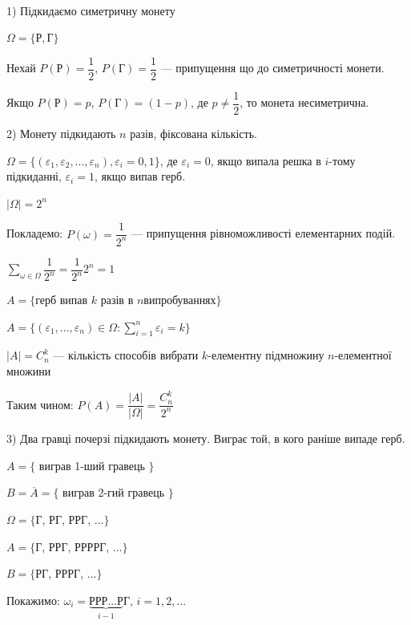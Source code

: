 \begin{example}~\par
    1) Підкидаємо симетричну монету

    $\Omega = \{\text{Р}, \text{Г}\}$

    Нехай $P(\text{Р}) = \dfrac{1}{2}$,
    $P(\text{Г}) = \dfrac{1}{2}$ --- припущення що до
    симетричності монети.

    Якщо $P(\text{Р}) = p$, $P(\text{Г}) = (1-p)$, де
    $p \neq \dfrac{1}{2}$, то монета несиметрична.

    2) Монету підкидають $n$ разів, фіксована кількість.

    $\Omega = \{(\varepsilon_1, \varepsilon_2, ..., \varepsilon_n), \varepsilon_i = 0,1\}$,
    де $\varepsilon_i = 0$, якщо випала решка в $i$-тому
    підкиданні, $\varepsilon_i = 1$, якщо випав герб.

    $|\Omega| = 2^n$

    Покладемо: $P(\omega) = \dfrac{1}{2^n}$ --- припущення
    рівноможливості елементарних подій.

    \begin{remark}
        $\sum\limits_{\omega \in \Omega} \dfrac{1}{2^n}
        = \dfrac{1}{2^n} 2^n = 1$

        $A = \{\text{герб випав } k \text{ разів в } n
        \text{випробуваннях}\}$

        $A = \{(\varepsilon_1, ..., \varepsilon_n) \in \Omega:
        \sum\limits_{i = 1}^n \varepsilon_i = k\}$

        $|A| = C_n^k$ --- кількість способів вибрати $k$-елементну
        підмножину $n$-елементної множини

        Таким чином: $P(A) = \dfrac{|A|}{|\Omega|}
        = \dfrac{C_n^k}{2^n}$

    \end{remark}

    3) Два гравці почерзі підкидають монету. Виграє той, в кого
    раніше випаде герб.

    $A = \{$ виграв 1-ший гравець $\}$

    $B = \overline{A} = \{$ виграв 2-гий гравець $\}$

    $\Omega = \{$Г, РГ, РРГ, ...$\}$

    $A = \{$Г, РРГ, РРРРГ, ...$\}$

    $B = \{$РГ, РРРГ, ...$\}$

    Покажимо: $\omega_i = \underbrace{\text{РРР...Р}}\limits_{i-1}\text{Г}$,
    $i = 1, 2, ...$


\end{example}
